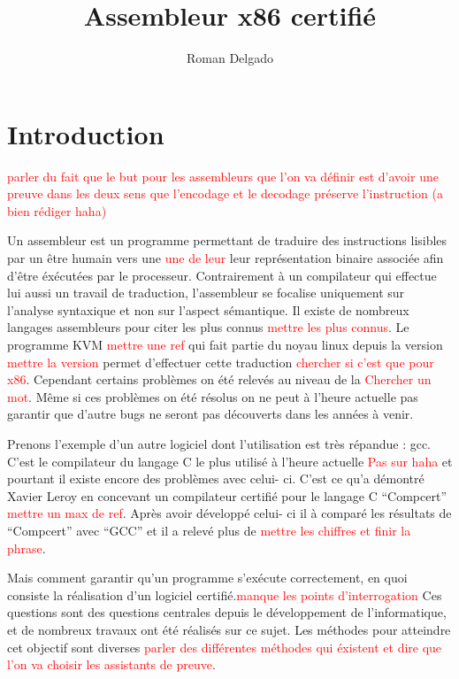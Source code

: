 \documentclass {article}
\title{Assembleur x86 certifié}
\author{Roman Delgado}
\date{}
\theoremstyle{definition}
\theoremstyle{remark}
\newcommand{\todo}[1]{\textcolor{red}{#1}}
\begin{document}
\maketitle



\vfill
\setcounter{tocdepth}{2}
\tableofcontents
\vfill


\section{Introduction}

\todo{parler du fait que le but pour les assembleurs que l'on va définir est d'avoir une preuve dans les deux sens
  que l'encodage et le decodage préserve l'instruction (a bien rédiger haha)}

Un assembleur est un programme permettant de traduire des instructions lisibles par un être humain vers
une \todo{une de leur} leur représentation binaire associée afin d'être éxécutées par le processeur. Contrairement à un compilateur
qui effectue lui aussi un travail de traduction, l'assembleur se focalise uniquement sur l'analyse syntaxique
et non sur l'aspect sémantique.
Il existe de nombreux langages 
assembleurs pour citer les plus connus \todo{mettre les plus connus}.
Le programme KVM \todo{mettre une ref} qui fait partie du noyau linux depuis la version \todo{mettre la version}
permet d'effectuer cette traduction \todo{chercher si c'est que pour x86}.
Cependant certains problèmes on été relevés au niveau de la \todo{Chercher un mot}.
Même si ces problèmes on été résolus on ne peut à l'heure actuelle pas garantir que d'autre bugs ne seront pas
découverts dans les années à venir.

Prenons l'exemple d'un autre logiciel dont l'utilisation est très répandue : gcc. C'est le compilateur
du langage C le plus utilisé à l'heure actuelle \todo{Pas sur haha} et pourtant il existe encore des
problèmes avec celui- ci. C'est ce qu'a démontré Xavier Leroy en concevant un compilateur certifié pour le langage C ``Compcert''
\todo{mettre un max de ref}. Après avoir développé celui- ci il à comparé les résultats de ``Compcert'' avec ``GCC''
et il a relevé plus de \todo{mettre les chiffres et finir la phrase}.


Mais comment garantir qu'un programme s'exécute correctement, en quoi consiste la réalisation d'un logiciel certifié.\todo{manque les points d'interrogation}
Ces questions sont des questions centrales depuis le développement de l'informatique, et de nombreux travaux ont été
réalisés sur ce sujet. Les méthodes pour atteindre cet objectif sont diverses \todo{parler des différentes méthodes qui éxistent et dire
que l'on va choisir les assistants de preuve}.
\end{document}
